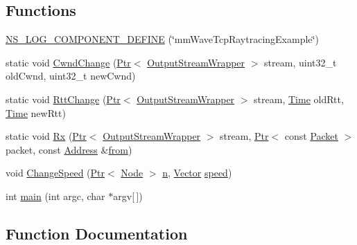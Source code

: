 \subsection*{Functions}
\begin{DoxyCompactItemize}
\item 
\hyperlink{mmwave-tcp-raytracing-example_8cc_a56108c7b1f943d8bcf161fb72b4e1d60}{N\+S\+\_\+\+L\+O\+G\+\_\+\+C\+O\+M\+P\+O\+N\+E\+N\+T\+\_\+\+D\+E\+F\+I\+NE} (\char`\"{}mm\+Wave\+Tcp\+Raytracing\+Example\char`\"{})
\item 
static void \hyperlink{mmwave-tcp-raytracing-example_8cc_a029700a26394b63e7e4f8fe0dc2a3e0d}{Cwnd\+Change} (\hyperlink{classns3_1_1Ptr}{Ptr}$<$ \hyperlink{classns3_1_1OutputStreamWrapper}{Output\+Stream\+Wrapper} $>$ stream, uint32\+\_\+t old\+Cwnd, uint32\+\_\+t new\+Cwnd)
\item 
static void \hyperlink{mmwave-tcp-raytracing-example_8cc_a9490f3a2b4f07bb82ec1024befcb57a8}{Rtt\+Change} (\hyperlink{classns3_1_1Ptr}{Ptr}$<$ \hyperlink{classns3_1_1OutputStreamWrapper}{Output\+Stream\+Wrapper} $>$ stream, \hyperlink{classns3_1_1Time}{Time} old\+Rtt, \hyperlink{classns3_1_1Time}{Time} new\+Rtt)
\item 
static void \hyperlink{mmwave-tcp-raytracing-example_8cc_a44926b91325d01c8749a8e4728a65087}{Rx} (\hyperlink{classns3_1_1Ptr}{Ptr}$<$ \hyperlink{classns3_1_1OutputStreamWrapper}{Output\+Stream\+Wrapper} $>$ stream, \hyperlink{classns3_1_1Ptr}{Ptr}$<$ const \hyperlink{classns3_1_1Packet}{Packet} $>$ packet, const \hyperlink{classns3_1_1Address}{Address} \&\hyperlink{lte__amc_8m_a1b4c81ff74eb1a626b5ade44c81004b3}{from})
\item 
void \hyperlink{mmwave-tcp-raytracing-example_8cc_a1fe18c61b129ac2c333ca0c841e280ee}{Change\+Speed} (\hyperlink{classns3_1_1Ptr}{Ptr}$<$ \hyperlink{classns3_1_1Node}{Node} $>$ \hyperlink{lte__link__budget__x2__handover__measures_8m_abdb05bc5a064cf642a06c83b3392f148}{n}, \hyperlink{classns3_1_1Vector3D_a7e59b47bc94c9cb1dadff68c1d0112d8}{Vector} \hyperlink{mmwave-amc-test_8cc_a6dc6e6f3c75c509ce943163afb5dade7}{speed})
\item 
int \hyperlink{mmwave-tcp-raytracing-example_8cc_a0ddf1224851353fc92bfbff6f499fa97}{main} (int argc, char $\ast$argv\mbox{[}$\,$\mbox{]})
\end{DoxyCompactItemize}


\subsection{Function Documentation}
